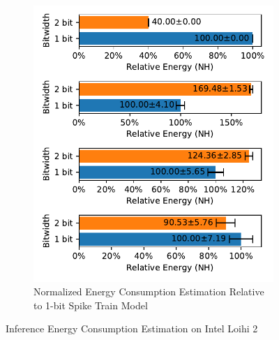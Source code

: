 \begin{figure}[H]
\begin{subfigure}[H]{0.48\textwidth}
                \includegraphics[width=\textwidth]{../timesteps/CIFAR10/plots/cifar10_test_relative_energy_nh.pdf}
                \caption{Normalized Energy Consumption Estimation Relative to 1-bit Spike Train Model}
            \end{subfigure}
            \caption{Inference Energy Consumption Estimation on Intel Loihi 2}
        \end{figure}

